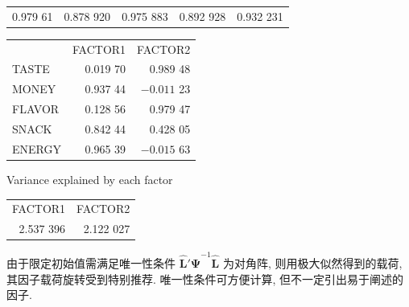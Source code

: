 \begin{mvframe}[显示板 9.1(续)]
{{\begin{tabular}{*{5}{r}}
0.979 61 & 0.878 920 & 0.975 883 & 0.892 928 & 0.932 231\\
\end{tabular}\par}
\vspace{10pt}
\noindent{}\par
\vspace{10pt}
{\centering {}\par}
\vspace{8pt}
{\centering
\begin{tabular}{lrr}
& FACTOR1 & FACTOR2\\
TASTE & 0.019 70 & 0.989 48\\
MONEY & 0.937 44 & $-0.011$ 23\\
FLAVOR & 0.128 56 & 0.979 47\\
SNACK & 0.842 44 & 0.428 05\\
ENERGY & 0.965 39 & $-0.015$ 63\\
\end{tabular}\par}
\vspace{10pt}
{\centering Variance explained by each factor\par}
\vspace{8pt}
{\centering
\begin{tabular}{rr}
FACTOR1 & FACTOR2\\
2.537 396 & 2.122 027\\
\end{tabular}\par}
}
\end{mvframe}

由于限定初始值需满足唯一性条件 $\hat{\mathbf{L}}'\hat{\boldsymbol{\Psi}}^{-1}\hat{\mathbf{L}}$ 为对角阵, 则用极大似然得到的载荷, 其因子载荷旋转受到特别推荐. 唯一性条件可方便计算, 但不一定引出易于阐述的因子.
